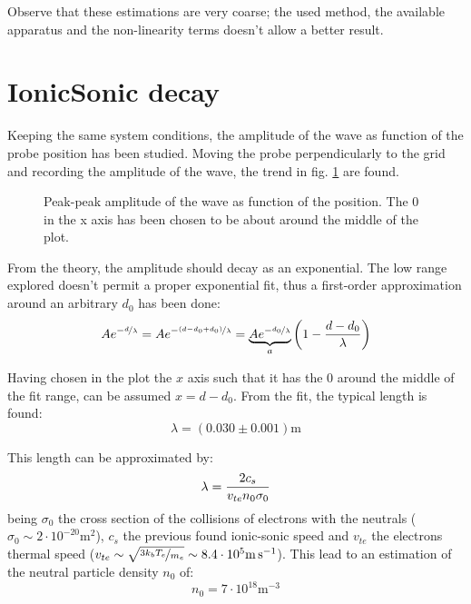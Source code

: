 \documentclass[11pt,a4 paper]{article}
\let\oldfrac\frac
\renewcommand{\frac}[3][d]{\ifthenelse{\equal{#1}{d}}{\oldfrac{#2}{#3}}{\nicefrac{#2}{#3}}}
\begin{document}
Observe that these estimations are very coarse; the used method, the available apparatus and the non-linearity terms doesn't allow a better result.


\section{IonicSonic decay}
Keeping the same system conditions, the amplitude of the wave as function of the probe position has been studied. Moving the probe perpendicularly to the grid and recording the amplitude of the wave, the trend in fig. \ref{fig:ionicsonic:expdecay} are found.

\begin{figure}[H]
  \centering
  \caption{Peak-peak amplitude of the wave as function of the position. The $0$ in the x axis has been chosen to be about around the middle of the plot.}
  \label{fig:ionicsonic:expdecay}
\end{figure}

From the theory, the amplitude should decay as an exponential. The low range explored doesn't permit a proper exponential fit, thus a first-order approximation around an arbitrary $d_0$ has been done:
\begin{equation*}
  Ae^{-\frac[f]{d}{\lambda}} = Ae^{-\frac[f]{(d-d_0+d_0)}{\lambda}} =  \underbrace{Ae^{-\frac[f]{d_0}{\lambda}}}_{a} \left( 1 - \frac{d-d_0}{\lambda}\right)
\end{equation*}

Having chosen in the plot the $x$ axis such that it has the $0$ around the middle of the fit range, can be assumed $x = d-d_0$. From the fit, the typical length is found:
\begin{equation*}
  \lambda = ( 0.030 \pm 0.001 )\si{\metre}
\end{equation*}

This length can be approximated by:
\begin{equation*}
  \lambda = \frac{2c_s}{v_{te}n_0\sigma_0}
\end{equation*}
being $\sigma_0$ the cross section of the collisions of electrons with the neutrals ($\sigma_0\sim2\cdot10^{-20}\si{\metre\squared}$), $c_s$ the previous found ionic-sonic speed and $v_{te}$ the electrons thermal speed ($v_{te}\sim\sqrt{\frac[f]{3k_bT_e}{m_e}}\sim8.4\cdot10^{5}\si{\metre\per\second}$). This lead to an estimation of the neutral particle density $n_0$ of:
\begin{equation*}
  n_0 = 7\cdot10^{18} \si{\metre^{-3}}
\end{equation*}
\end{document}
